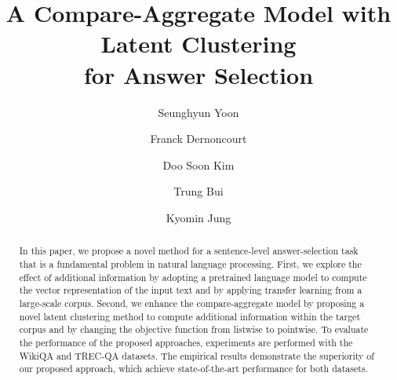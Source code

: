 \documentclass[sigconf]{acmart}
\begin{document}
\fancyhead{}




\title[A Compare-Aggregate Model with Latent Clustering for Answer Selection]{A Compare-Aggregate Model with Latent Clustering\\ for Answer Selection}





\author{Seunghyun Yoon}

\author{Franck Dernoncourt}

\author{Doo Soon Kim}

\author{Trung Bui}

\author{Kyomin Jung}



\renewcommand{\shortauthors}{Yoon, et al.}

\begin{abstract}
In this paper, we propose a novel method for a sentence-level answer-selection task that is a fundamental problem in natural language processing.
First, we explore the effect of additional information by adopting a pretrained language model to compute the vector representation of the input text and by applying transfer learning from a large-scale corpus. 
Second, we enhance the compare-aggregate model by proposing a novel latent clustering method to compute additional information within the target corpus and by changing the objective function from listwise to pointwise.
To evaluate the performance of the proposed approaches, experiments are performed with the WikiQA and TREC-QA datasets. The empirical results demonstrate the superiority of our proposed approach, which achieve state-of-the-art performance for both datasets.
\end{abstract}
\end{document}
